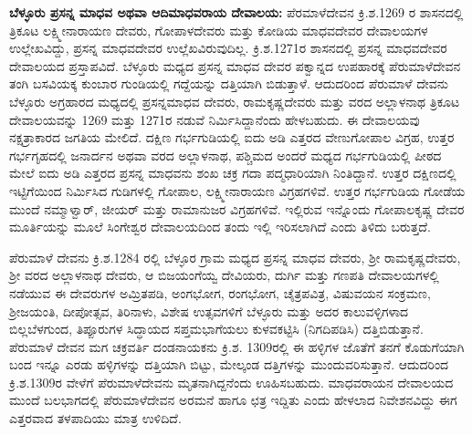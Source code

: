 \textbf{ಬೆಳ್ಳೂರು ಪ್ರಸನ್ನ ಮಾಧವ ಅಥವಾ ಆದಿಮಾಧವರಾಯ ದೇವಾಲಯ:} ಪೆರಮಾಳೆದೇವನ ಕ್ರಿ.ಶ.1269 ರ ಶಾಸನದಲ್ಲಿ ತ್ರಿಕೂಟ ಲಕ್ಷ್ಮೀನಾರಾಯಣ ದೇವರು, ಗೋಪಾಳದೇವರು ಮತ್ತು ಕೋಡಿಯ ಮಾಧವದೇವರ ದೇವಾಲಯಗಳ ಉಲ್ಲೇಖವಿದ್ದು, ಪ್ರಸನ್ನ ಮಾಧವದೇವರ ಉಲ್ಲೆಖವಿರುವುದಿಲ್ಲ. ಕ್ರಿ.ಶ.1271ರ ಶಾಸನದಲ್ಲಿ ಪ್ರಸನ್ನ ಮಾಧವದೇವರ ದೇವಾಲಯದ ಪ್ರಸ್ತಾಪವಿದೆ. ಬೆಳ್ಳೂರು ಮಧ್ಯದ ಪ್ರಸನ್ನ ಮಾಧವ ದೇವರ ಪಕ್ವಾನ್ನದ ಉಪಹಾರಕ್ಕೆ ಪೆರುಮಾಳೆದೇವನ ತಂಗಿ ಬಸವಿಯಕ್ಕ ಕುಂಬಾರ ಗುಂಡಿಯಲ್ಲಿ ಗದ್ದೆಯನ್ನು ದತ್ತಿಯಾಗಿ ಬಿಡುತ್ತಾಳೆ. ಆದುದರಿಂದ ಪೆರುಮಾಳೆ ದೇವನು ಬೆಳ್ಳೂರು ಅಗ್ರಹಾರದ ಮಧ್ಯದಲ್ಲಿ ಪ್ರಸನ್ನಮಾಧವ ದೇವರು, ರಾಮಕೃಷ್ಣದೇವರು ಮತ್ತು ವರದ ಅಲ್ಲಾಳನಾಥ ತ್ರಿಕೂಟ ದೇವಾಲಯವನ್ನು 1269 ಮತ್ತು 1271ರ ನಡುವೆ ನಿರ್ಮಿಸಿದ್ದಾನೆಂದು ಹೇಳಬಹುದು. ಈ ದೇವಾಲಯವು ನಕ್ಷತ್ರಾಕಾರದ ಜಗತಿಯ ಮೇಲಿದೆ. ದಕ್ಷಿಣ ಗರ್ಭಗುಡಿಯಲ್ಲಿ ಐದು ಅಡಿ ಎತ್ತರದ ವೇಣುಗೋಪಾಲ ವಿಗ್ರಹ, ಉತ್ತರ ಗರ್ಭಗೃಹದಲ್ಲಿ ಜನಾರ್ದನ ಅಥವಾ ವರದ ಅಲ್ಲಾಳನಾಥ, ಪಶ್ಚಿಮದ ಅಂದರೆ ಮಧ್ಯದ ಗರ್ಭಗುಡಿಯಲ್ಲಿ ಪೀಠದ ಮೇಲೆ ಐದು ಅಡಿ ಎತ್ತರದ ಪ್ರಸನ್ನ ಮಾಧವನು ಶಂಖ ಚಕ್ರ ಗದಾ ಪದ್ಮಧಾರಿಯಾಗಿ ನಿಂತಿದ್ದಾನೆ. ಉತ್ತರ ದಕ್ಷಿಣದಲ್ಲಿ ಇಟ್ಟಿಗೆಯಿಂದ ನಿರ್ಮಿಸಿದ ಗುಡಿಗಳಲ್ಲಿ ಗೋಪಾಲ, ಲಕ್ಷ್ಮೀನಾರಾಯಣ ವಿಗ್ರಹಗಳಿವೆ. ಉತ್ತರ ಗರ್ಭಗುಡಿಯ ಗೋಡೆಯ ಮುಂದೆ ನಮ್ಮಾಳ್ವಾರ್​, ಜೀಯರ್​ ಮತ್ತು ರಾಮಾನುಜರ ವಿಗ್ರಹಗಳಿವೆ. ಇಲ್ಲಿರುವ ಇನ್ನೊಂದು ಗೋಪಾಲಕೃಷ್ಣ ದೇವರ ಮೂರ್ತಿಯನ್ನು ಮೂಲೆ ಸಿಂಗೇಶ್ವರ ದೇವಾಲಯದಿಂದ ತಂದು ಇಲ್ಲಿ ಇರಿಸಲಾಗಿದೆ ಎಂದು ತಿಳಿದು ಬರುತ್ತದೆ.

ಪೆರುಮಾಳೆ ದೇವನು ಕ್ರಿ.ಶ.1284 ರಲ್ಲಿ ಬೆಳ್ಳೂರ ಗ್ರಾಮ ಮಧ್ಯದ ಪ್ರಸನ್ನ ಮಾಧವ ದೇವರು, ಶ‍್ರೀ ರಾಮಕೃಷ್ಣದೇವರು, ಶ‍್ರೀ ವರದ ಅಲ್ಲಾಳನಾಥ ದೇವರು, ಆ ಬಿಜಯಂಗೆಯ್ವ ದೇವಿಯರು, ದುರ್ಗಿ ಮತ್ತು ಗಣಪತಿ ದೇವಾಲಯಗಳಲ್ಲಿ ನಡೆಯುವ ಈ ದೇವರುಗಳ ಅಮ್ರಿತಪಡಿ, ಅಂಗಭೋಗ, ರಂಗಭೋಗ, ಚೈತ್ರಪವಿತ್ರ, ವಿಷುವಯನ ಸಂಕ್ರಮಣ, ಶ‍್ರೀಜಯಂತಿ, ದೀಪೋತ್ಸವ, ತಿರಿನಾಳು, ವಿಶೇಷ ಉತ್ಸವಗಳಿಗೆ ಬೆಳ್ಳೂರು ಮತ್ತು ಅದರ ಕಾಲುವಳ್ಳಿಗಳಾದ ಬಿಲ್ಲಬೆಳಗುಂದ, ತಿಪ್ಪೂರುಗಳ ಸಿದ್ಧಾಯದ ಸಪ್ತಮಭಾಗೆಯಲು ಕುಳವಕಟ್ಟಿಸಿ (ನಿಗದಿಪಡಿಸಿ) ದತ್ತಿಬಿಡುತ್ತಾನೆ. ಪೆರುಮಾಳೆ ದೇವನ ಮಗ ಚಕ್ರವರ್ತಿ ದಂಡನಾಯಕನು ಕ್ರಿ.ಶ. 1309ರಲ್ಲಿ ಈ ಹಳ್ಳಿಗಳ ಜೊತೆಗೆ ತನಗೆ ಕೊಡುಗೆಯಾಗಿ ಬಂದ ಇನ್ನೂ ಎರಡು ಹಳ್ಳಿಗಳನ್ನು ದತ್ತಿಯಾಗಿ ಬಿಟ್ಟು, ಮೇಲ್ಕಂಡ ದತ್ತಿಗಳನ್ನು ಮುಂದುವರಿಸುತ್ತಾನೆ. ಆದುದರಿಂದ ಕ್ರಿ.ಶ.1309ರ ವೇಳೆಗೆ ಪೆರುಮಾಳೆದೇವನು ಮೃತನಾಗಿದ್ದನೆಂದು ಊಹಿಸಬಹುದು. ಮಾಧವರಾಯನ ದೇವಾಲಯದ ಮು‌ಂದೆ ಬಲಭಾಗದಲ್ಲಿ ಪೆರುಮಾಳೆದೇವನ ಅರಮನೆ ಹಾಗೂ ಛತ್ರ ಇದ್ದಿತು ಎಂದು ಹೇಳಲಾದ ನಿವೇಶನವಿದ್ದು ಈಗ ಎತ್ತರವಾದ ತಳಪಾದಿಯು ಮಾತ್ರ ಉಳಿದಿದೆ.

